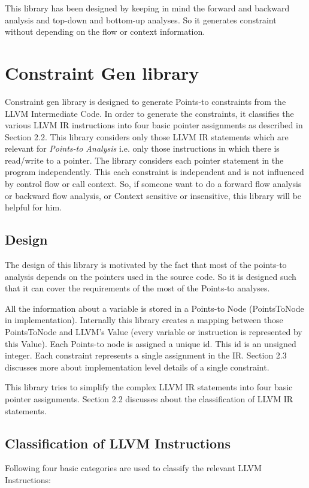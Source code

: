\documentclass[a4paper,11pt]{report}
\begin{document}
This library has been designed by keeping in mind the forward and backward
analysis and top-down and bottom-up analyses. So it generates constraint
without depending on the flow or context information.

\chapter{Constraint Gen library}

Constraint gen library is designed to generate Points-to constraints from the
LLVM Intermediate Code. In order to generate the constraints, it classifies the
various LLVM IR instructions into four basic pointer assignments as described 
in Section 2.2. This library considers only those LLVM IR statements which are
relevant for \textit{Points-to Analysis} i.e. only those instructions in which 
there is 
read/write to a pointer. The library considers each pointer statement in the 
program independently. This each constraint is independent and is not 
influenced by control flow or call context. So, if someone want to do a 
forward flow analysis or backward flow analysis, or Context sensitive or 
insensitive, this library will be helpful for him.


\section{Design}
The design of this library is motivated by the fact that most of the points-to 
analysis depends on the pointers used in the source code. So it is designed 
such that it can cover the requirements of the most of the Points-to analyses.

All the information about a variable is stored in a Points-to Node 
(PointsToNode in implementation). Internally this library creates a mapping 
between those PointsToNode and LLVM's Value (every variable or instruction is 
represented by this Value). Each Points-to node is assigned a unique id. This 
id is an unsigned integer. Each constraint represents a single assignment in 
the IR. Section 2.3 discusses more about implementation level details 
of a single constraint.

This library tries to simplify the complex LLVM IR statements into four basic 
pointer assignments. Section 2.2 discusses about the classification of LLVM IR 
statements.

\section{Classification of LLVM Instructions}
Following four basic categories are used to classify the relevant LLVM 
Instructions:
\end{document}
